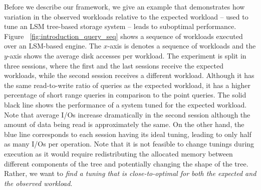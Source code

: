   Before we describe our framework, we give an example that demonstrates how
variation in the observed workloads relative to the expected workload -- used to tune an LSM tree-based storage system --
leads to suboptimal performance. 
Figure ~\ref{fig:introduction_query_seq} shows a sequence of 
    workloads executed over an LSM-based engine. 
The $x$-axis is denotes a sequence of workloads and the $y$-axis shows the average 
    disk accesses per workload. 
The experiment is split in three sessions, where the first and the last sessions 
    receive the expected workloads,
    while the second session receives a different workload.
Although it has the same read-to-write ratio of queries as the expected 
    workload, it has a higher percentage of short range queries in comparison
    to the point queries.
The solid black line shows the performance of a system tuned for the expected 
    workload. 
Note that average I/Os increase dramatically in the second session 
    although the amount of data being read is approximately the same.
On the other hand, the blue line corresponds to
each session having its ideal tuning, leading to only half as many I/Os per operation.
Note that it is not feasible to change tunings during execution as it would require
redistributing the allocated memory between different components of the tree and
potentially changing the shape of the tree. Rather, we want to \emph{find a 
tuning that is close-to-optimal for both the expected and the observed 
workload}.


